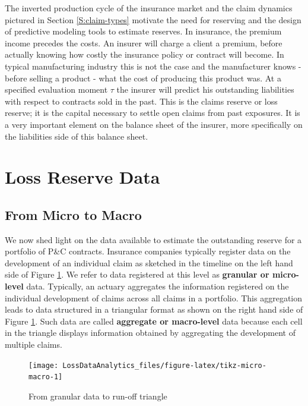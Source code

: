 \documentclass[]{book}
\begin{document}
The inverted production cycle of the insurance market and the claim
dynamics pictured in Section \ref{S:claim-types} motivate the need for
reserving and the design of predictive modeling tools to estimate
reserves. In insurance, the premium income precedes the costs. An
insurer will charge a client a premium, before actually knowing how
costly the insurance policy or contract will become. In typical
manufacturing industry this is not the case and the manufacturer knows -
before selling a product - what the cost of producing this product was.
At a specified evaluation moment \(\tau\) the insurer will predict his
outstanding liabilities with respect to contracts sold in the past. This
is the claims reserve or loss reserve; it is the capital necessary to
settle open claims from past exposures. It is a very important element
on the balance sheet of the insurer, more specifically on the
liabilities side of this balance sheet.

\section{Loss Reserve Data}\label{S:Data}

\subsection{From Micro to Macro}\label{from-micro-to-macro}

We now shed light on the data available to estimate the outstanding
reserve for a portfolio of P\&C contracts. Insurance companies typically
register data on the development of an individual claim as sketched in
the timeline on the left hand side of Figure \ref{fig:tikz-micro-macro}.
We refer to data registered at this level as \textbf{granular or
micro-level} data. Typically, an actuary aggregates the information
registered on the individual development of claims across all claims in
a portfolio. This aggregation leads to data structured in a triangular
format as shown on the right hand side of Figure
\ref{fig:tikz-micro-macro}. Such data are called \textbf{aggregate or
macro-level} data because each cell in the triangle displays information
obtained by aggregating the development of multiple claims.

\begin{figure}

{\centering \texttt{[image: LossDataAnalytics\_files/figure-latex/tikz-micro-macro-1]} 

}

\caption{From granular data to run-off triangle}\label{fig:tikz-micro-macro}
\end{figure}
\end{document}
